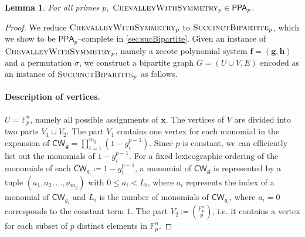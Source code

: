\documentclass[10pt,a4paper]{article}
\newtheorem{lemma}[theorem]{Lemma}
\theoremstyle{definition}
\theoremstyle{remark}
\newcommand{\bbF}{\ensuremath{\mathbb{F}}}
\newcommand{\vecf}{\ensuremath{\boldsymbol{f}}}
\newcommand{\vecg}{\ensuremath{\boldsymbol{g}}}
\newcommand{\vech}{\ensuremath{\boldsymbol{h}}}
\newcommand{\vecx}{\ensuremath{\boldsymbol{x}}}
\newcommand{\class}[1]{\ensuremath{\mathsf{#1}}\xspace}
\newcommand{\PPA}{\class{PPA}}
\newcommand{\PPAp}{\class{PPA}_{{p}}}
\newcommand{\pnum}{p}
\newcommand{\sucBipartite}{\ensuremath{\textsc{SuccinctBipartite}}}
\newcommand{\cChevalleyp}{\textsc{ChevalleyWithSymmetry}_{\pnum}}
\newcommand{\CW}{\mathsf{CW}}
\begin{document}
\begin{lemma} \label{lem:combinedChevalleyPPAp}
 For all primes $p$, $\cChevalleyp \in \PPAp$.
\end{lemma}
\begin{proof}We reduce $\cChevalleyp$ to $\sucBipartite_p$, which we show to be $\PPA_p$--complete in \autoref{sec:sucBipartite}. Given an instance of $\cChevalleyp$, namely a zecote polynomial system $\vecf = (\vecg, \vech)$ and a permutation $\sigma$, we construct a bipartite graph $G = (U \cup V, E)$ encoded as an instance of $\sucBipartite_p$ as follows. 

 \paragraph{Description of vertices.} $U = \bbF_p^n$, namely all possible assignments
 of $\vecx$. The vertices of $V$ are divided into two parts $V_1 \cup V_2$.
 The part $V_1$ contains one vertex for each monomial in the expansion of $\CW_{\vecg} = \prod_{i = 1}^{m_g} (1 - g_i^{p-1})$. Since $p$ is constant, we can
 efficiently list out the monomials of $1 - g_{i}^{p-1}$. For a fixed lexicographic ordering of the
 monomials of each $\CW_{g_i} \coloneqq 1 - g_{i}^{p-1}$, a
 monomial of $\CW_{\vecg}$ is represented by a tuple
 $(a_1, a_{2}, \dots, a_{m_g})$ with $0 \leq a_{i} < L_{i}$, where
 $a_{i}$ represents the index of a monomial of $\CW_{g_i}$ and  $L_{i}$
 is the number of monomials of $\CW_{g_i}$, where $a_i = 0$ corresponds to the constant term $1$. The part $V_2 \coloneqq \binom{\bbF_p^n}{p}$, i.e. it contains a vertex for each subset of $p$ distinct elements in $\bbF_p^n$.



\end{proof}
\end{document}
